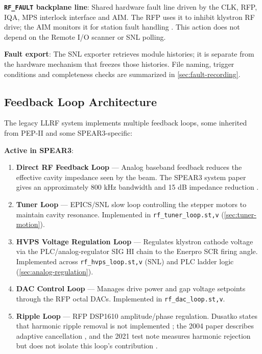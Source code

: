 \textbf{\texttt{RF\_FAULT} backplane line}: Shared hardware fault line driven by the CLK, RFP, IQA, MPS interlock interface and AIM. The RFP uses it to inhibit klystron RF drive; the AIM monitors it for station fault handling . This action does not depend on the Remote I/O scanner or SNL polling.

\textbf{Fault export}: The SNL exporter retrieves module histories; it is separate from the hardware mechanism that freezes those histories. File naming, trigger conditions and completeness checks are summarized in \cref{sec:fault-recording}.


\subsection{Feedback Loop Architecture}\label{sec:feedback-loops}

The legacy LLRF system implements multiple feedback loops, some inherited from PEP-II and some SPEAR3-specific:

\textbf{Active in SPEAR3}:

\begin{enumerate}
\def\labelenumi{\arabic{enumi}.}
\tightlist
\item
  \textbf{Direct RF Feedback Loop} --- Analog baseband feedback reduces the effective cavity impedance seen by the beam. The SPEAR3 system paper gives an approximately 800 kHz bandwidth and 15 dB impedance reduction . 
\item
  \textbf{Tuner Loop} --- EPICS/SNL slow loop controlling the stepper motors to maintain cavity resonance. Implemented in \texttt{rf\_tuner\_loop.st,v} (\cref{sec:tuner-motion}).
\item
  \textbf{HVPS Voltage Regulation Loop} --- Regulates klystron cathode voltage via the PLC/analog-regulator SIG HI chain to the Enerpro SCR firing angle. Implemented across \texttt{rf\_hvps\_loop.st,v} (SNL) and PLC ladder logic (\cref{sec:analog-regulation}).
\item
  \textbf{DAC Control Loop} --- Manages drive power and gap voltage setpoints through the RFP octal DACs. Implemented in \texttt{rf\_dac\_loop.st,v}.
\item
  \textbf{Ripple Loop} --- RFP DSP1610 amplitude/phase regulation. Dusatko states that harmonic ripple removal is not implemented ; the 2004 paper describes adaptive cancellation , and the 2021 test note measures harmonic rejection but does not isolate this loop's contribution . 
\end{enumerate}

